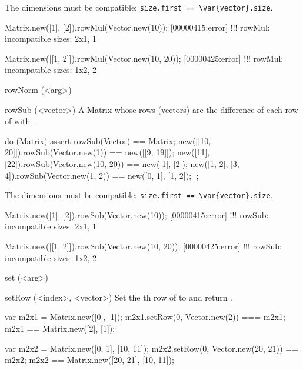 \begin{urbiscriptapi}
  The dimensions must be compatible:
  \lstinline|size.first == \var{vector}.size|.
\begin{urbiscript}
Matrix.new([1], [2]).rowMul(Vector.new(10));
[00000415:error] !!! rowMul: incompatible sizes: 2x1, 1

Matrix.new([[1, 2]]).rowMul(Vector.new(10, 20));
[00000425:error] !!! rowMul: incompatible sizes: 1x2, 2
\end{urbiscript}


\item[rowNorm](<arg>)%
\begin{urbiassert}

\end{urbiassert}

\item[rowSub](<vector>)%
  A Matrix whose rows (vectors) are the difference of each row of \this with
  .
\begin{urbiscript}
do (Matrix)
{
  assert
  {
    rowSub(Vector) == Matrix;
    new([[10, 20]]).rowSub(Vector.new(1))     == new([[9, 19]]);
    new([11], [22]).rowSub(Vector.new(10, 20)) == new([1], [2]);
    new([1, 2], [3, 4]).rowSub(Vector.new(1, 2)) == new([0, 1], [1, 2]);
  }
}|;
\end{urbiscript}

  The dimensions must be compatible:
  \lstinline|size.first == \var{vector}.size|.
\begin{urbiscript}
Matrix.new([1], [2]).rowSub(Vector.new(10));
[00000415:error] !!! rowSub: incompatible sizes: 2x1, 1

Matrix.new([[1, 2]]).rowSub(Vector.new(10, 20));
[00000425:error] !!! rowSub: incompatible sizes: 1x2, 2
\end{urbiscript}


\item[set](<arg>)%
\begin{urbiassert}

\end{urbiassert}

\item[setRow](<index>, <vector>)%
  Set the th row of \this to  and return \this.
\begin{urbiassert}
var m2x1 = Matrix.new([0], [1]);
m2x1.setRow(0, Vector.new(2)) === m2x1;
m2x1 == Matrix.new([2], [1]);

var m2x2 = Matrix.new([0, 1], [10, 11]);
m2x2.setRow(0, Vector.new(20, 21)) == m2x2;
m2x2 == Matrix.new([20, 21], [10, 11]);
\end{urbiassert}


\end{urbiscriptapi}
